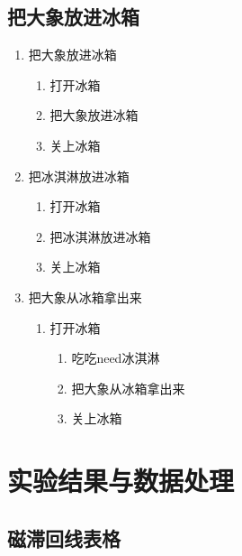 \documentclass[11pt]{article}
\begin{document}
\subsection{把大象放进冰箱}
\begin{enumerate}
    \item 把大象放进冰箱
    \begin{enumerate}
        \item 打开冰箱    
        \item 把大象放进冰箱
        \item 关上冰箱
    \end{enumerate}

    \item 把冰淇淋放进冰箱
    \begin{enumerate}
        \item 打开冰箱
        \item 把冰淇淋放进冰箱
        \item 关上冰箱
    \end{enumerate}

    \item 把大象从冰箱拿出来
    \begin{enumerate}
        \item 打开冰箱
        \begin{enumerate}
            \item 吃吃need冰淇淋
            \item 把大象从冰箱拿出来
        \item 关上冰箱
        \end{enumerate}
    \end{enumerate}
\end{enumerate}

\section{实验结果与数据处理}

\subsection{磁滞回线表格}
\end{document}
